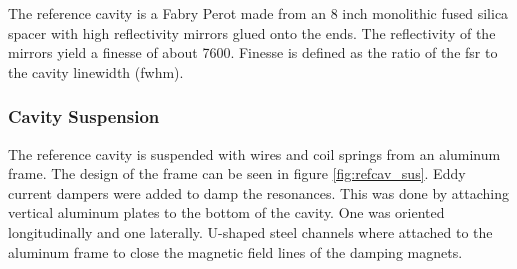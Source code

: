The reference cavity is a Fabry Perot made from an 8 inch monolithic fused silica
spacer with high reflectivity mirrors glued onto the ends. The reflectivity
of the mirrors yield a finesse of about 7600. Finesse is defined as the ratio
of the \ac{fsr} to the cavity linewidth (\ac{fwhm}).


\subsubsection{Cavity Suspension}

The reference cavity is suspended with wires and coil springs from an aluminum
frame. The design of the frame can be seen in figure
\ref{fig:refcav_sus}.
Eddy current dampers were added to damp the resonances. This was done by
attaching vertical aluminum plates to the bottom of the cavity. One was
oriented longitudinally and one laterally.
U-shaped steel channels where attached to the aluminum frame to close the
magnetic field lines of the damping magnets.

